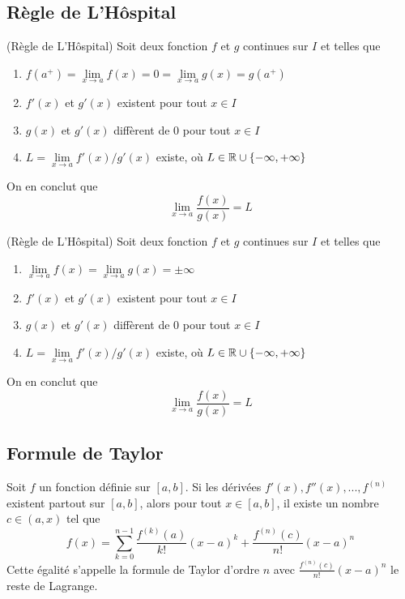 	\subsection{Règle de L'Hôspital}
		\begin{mythm}(Règle de L'Hôspital)
			Soit deux fonction $f$ et $g$ continues sur $I$ et telles que \begin{enumerate}[label=\alph*)]
				\item $f(a^+)=\lim\limits_{x\to a}f(x)=0=\lim\limits_{x\to a}g(x)=g(a^+)$
				\item $f'(x)$ et $g'(x)$ existent pour tout $x\in I$
				\item $g(x)$ et $g'(x)$ diffèrent de $0$ pour tout $x\in I$
				\item $L=\lim\limits_{x\to a}f'(x)/g'(x)$ existe, où $L\in\mathbb{R}\cup\{-\infty,+\infty\}$
			\end{enumerate}
			On en conclut que
			\[\lim_{x\to a} \frac{f(x)}{g(x)}=L\]
		\end{mythm}
		\begin{mythm}(Règle de L'Hôspital)
			Soit deux fonction $f$ et $g$ continues sur $I$ et telles que \begin{enumerate}[label=\alph*)]
				\item$\lim\limits_{x\to a}f(x)=\lim\limits_{x\to a}g(x)=\pm \infty$
				\item $f'(x)$ et $g'(x)$ existent pour tout $x\in I$
				\item $g(x)$ et $g'(x)$ diffèrent de $0$ pour tout $x\in I$
				\item $L=\lim\limits_{x\to a}f'(x)/g'(x)$ existe, où $L\in\mathbb{R}\cup\{-\infty,+\infty\}$
			\end{enumerate}
			On en conclut que
			\[\lim_{x\to a} \frac{f(x)}{g(x)}=L\]
		\end{mythm}
	\subsection{Formule de Taylor}
		\begin{mythm}
			Soit $f$ un fonction définie sur $[a,b]$. Si les dérivées $f'(x),f''(x),...,f^{(n)}$ existent partout sur $[a,b]$, alors pour tout $x\in [a,b]$, il existe un nombre $c\in (a,x)$ tel que \[f(x)=\sum_{k=0}^{n-1}\frac{f^{(k)}(a)}{k!}(x-a)^k + \frac{f^{(n)}(c)}{n!}(x-a)^n\]
			Cette égalité s'appelle la formule de Taylor d'ordre $n$ avec $\frac{f^{(n)}(c)}{n!}(x-a)^n$ le reste de Lagrange.
		\end{mythm}